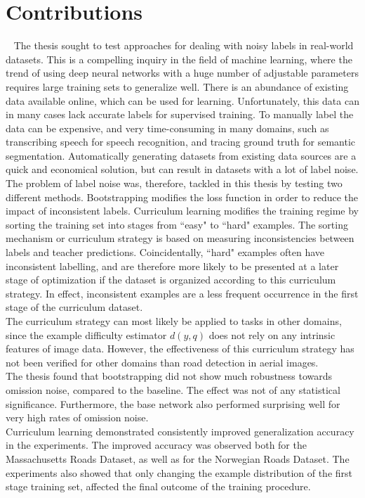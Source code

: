 \section{Contributions}~\label{cont}
\label{sec:Contributions}
The thesis sought to test approaches for dealing with noisy labels in real-world datasets. This is a compelling inquiry in the field of machine learning, where the trend of using deep neural networks with a huge number of adjustable parameters requires large training sets to generalize well. There is an abundance of existing data available online, which can be used for learning. Unfortunately, this data can in many cases lack accurate labels for supervised training. To manually label the data can be expensive, and very time-consuming in many domains, such as transcribing speech for speech recognition, and tracing ground truth for semantic segmentation. Automatically generating datasets from existing data sources are a quick and economical solution, but can result in datasets with a lot of label noise.\\

The problem of label noise was, therefore, tackled in this thesis by testing two different methods. Bootstrapping modifies the loss function in order to reduce the impact of inconsistent labels. Curriculum learning modifies the training regime by sorting the training set into stages from ``easy" to ``hard" examples. The sorting mechanism or curriculum strategy is based on measuring inconsistencies between labels and teacher predictions. Coincidentally, ``hard" examples often have inconsistent labelling, and are therefore more likely to be presented at a later stage of optimization if the dataset is organized according to this curriculum strategy. In effect, inconsistent examples are a less frequent occurrence in the first stage of the curriculum dataset.\\
 
The curriculum strategy can most likely be applied to tasks in other domains, since the example difficulty estimator $d(y,q)$ does not rely on any intrinsic features of image data. However, the effectiveness of this curriculum strategy has not been verified for other domains than road detection in aerial images.\\

The thesis found that bootstrapping did not show much robustness towards omission noise, compared to the baseline. The effect was not of any statistical significance. Furthermore, the base network also performed surprising well for very high rates of omission noise. \\

Curriculum learning demonstrated consistently improved generalization accuracy in the experiments. The improved accuracy was observed both for the Massachusetts Roads Dataset, as well as for the Norwegian Roads Dataset. The experiments also showed that only changing the example distribution of the first stage training set, affected the final outcome of the training procedure.\\

